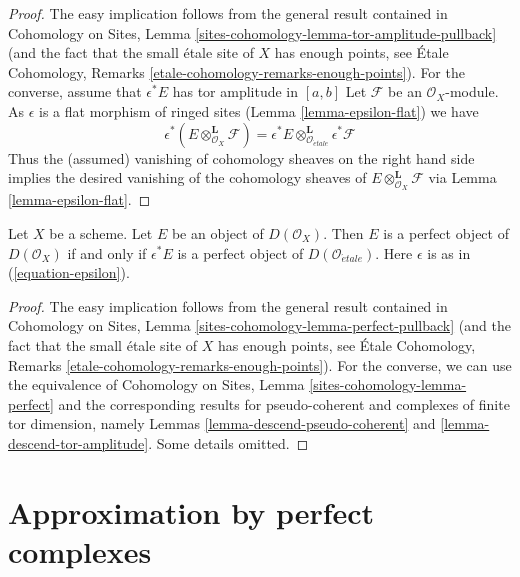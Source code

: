 \begin{proof}
The easy implication follows from the general result contained in
Cohomology on Sites, Lemma \ref{sites-cohomology-lemma-tor-amplitude-pullback}
(and the fact that the small \'etale site of $X$ has enough points, see
\'Etale Cohomology, Remarks \ref{etale-cohomology-remarks-enough-points}).
For the converse, assume that $\epsilon^*E$ has tor amplitude in $[a, b]$
Let $\mathcal{F}$ be an $\mathcal{O}_X$-module. As $\epsilon$ is a flat
morphism of ringed sites (Lemma \ref{lemma-epsilon-flat})
we have
$$
\epsilon^*(E \otimes^\mathbf{L}_{\mathcal{O}_X} \mathcal{F})
=
\epsilon^*E
\otimes^\mathbf{L}_{\mathcal{O}_{\acute{e}tale}}
\epsilon^*\mathcal{F}
$$
Thus the (assumed) vanishing of cohomology sheaves on the right hand side
implies the desired vanishing of the cohomology sheaves of
$E \otimes^\mathbf{L}_{\mathcal{O}_X} \mathcal{F}$ via
Lemma \ref{lemma-epsilon-flat}.
\end{proof}

\begin{lemma}
\label{lemma-descend-perfect}
Let $X$ be a scheme. Let $E$ be an object of $D(\mathcal{O}_X)$.
Then $E$ is a perfect object of $D(\mathcal{O}_X)$ if and only if
$\epsilon^*E$ is a perfect object of $D(\mathcal{O}_{\acute{e}tale})$.
Here $\epsilon$ is as in (\ref{equation-epsilon}).
\end{lemma}

\begin{proof}
The easy implication follows from the general result contained in
Cohomology on Sites, Lemma \ref{sites-cohomology-lemma-perfect-pullback}
(and the fact that the small \'etale site of $X$ has enough points, see
\'Etale Cohomology, Remarks \ref{etale-cohomology-remarks-enough-points}).
For the converse, we can use the equivalence of
Cohomology on Sites, Lemma \ref{sites-cohomology-lemma-perfect}
and the corresponding results for pseudo-coherent and complexes of
finite tor dimension, namely
Lemmas \ref{lemma-descend-pseudo-coherent} and
\ref{lemma-descend-tor-amplitude}.
Some details omitted.
\end{proof}









\section{Approximation by perfect complexes}
\label{section-approximation}

